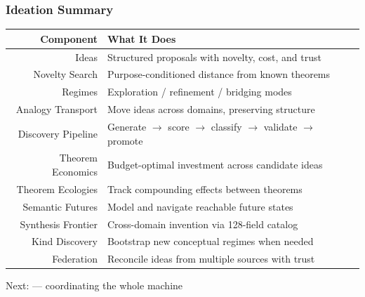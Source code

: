 \begin{frame}
\frametitle{Ideation Summary}
\begin{center}
\small
\begin{tabular}{@{} r l @{}}
  \toprule
  \textbf{Component} & \textbf{What It Does} \\
  \midrule
  Ideas              & Structured proposals with novelty, cost, and trust \\
  Novelty Search     & Purpose-conditioned distance from known theorems \\
  Regimes            & Exploration / refinement / bridging modes \\
  Analogy Transport  & Move ideas across domains, preserving structure \\
  Discovery Pipeline & Generate $\to$ score $\to$ classify $\to$ validate $\to$ promote \\
  Theorem Economics  & Budget-optimal investment across candidate ideas \\
  Theorem Ecologies  & Track compounding effects between theorems \\
  Semantic Futures   & Model and navigate reachable future states \\
  Synthesis Frontier & Cross-domain invention via 128-field catalog \\
  Kind Discovery     & Bootstrap new conceptual regimes when needed \\
  Federation         & Reconcile ideas from multiple sources with trust \\
  \bottomrule
\end{tabular}
\end{center}
\vfill
\begin{center}
\large Next:  --- coordinating the whole machine
\end{center}
\end{frame}
